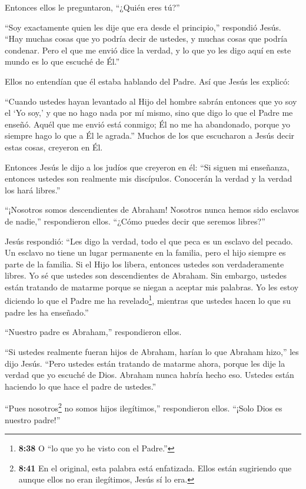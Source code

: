  Entonces ellos le preguntaron, ``¿Quién eres tú?''

``Soy exactamente quien les dije que era desde el principio,'' respondió
Jesús.  ``Hay muchas cosas que yo podría decir de ustedes,
y muchas cosas que podría condenar. Pero el que me envió dice la verdad,
y lo que yo les digo aquí en este mundo es lo que escuché de Él.''

 Ellos no entendían que él estaba hablando del Padre. Así
que Jesús les explicó:

 ``Cuando ustedes hayan levantado al Hijo del hombre sabrán
entonces que yo soy el `Yo soy,' y que no hago nada por mí mismo, sino
que digo lo que el Padre me enseñó.  Aquél que me envió
está conmigo; Él no me ha abandonado, porque yo siempre hago lo que a Él
le agrada.''  Muchos de los que escucharon a Jesús decir
estas cosas, creyeron en Él.

 Entonces Jesús le dijo a los judíos que creyeron en él:
``Si siguen mi enseñanza, entonces ustedes son realmente mis discípulos.
 Conocerán la verdad y la verdad los hará libres.''

 ``¡Nosotros somos descendientes de Abraham! Nosotros nunca
hemos sido esclavos de nadie,'' respondieron ellos. ``¿Cómo puedes decir
que seremos libres?''

 Jesús respondió: ``Les digo la verdad, todo el que peca es
un esclavo del pecado.  Un esclavo no tiene un lugar
permanente en la familia, pero el hijo siempre es parte de la familia.
 Si el Hijo los libera, entonces ustedes son verdaderamente
libres.  Yo sé que ustedes son descendientes de Abraham.
Sin embargo, ustedes están tratando de matarme porque se niegan a
aceptar mis palabras.  Yo les estoy diciendo lo que el
Padre me ha revelado\footnote{\textbf{8:38} O ``lo que yo he visto con
  el Padre.''}, mientras que ustedes hacen lo que su padre les ha
enseñado.''

 ``Nuestro padre es Abraham,'' respondieron ellos.

``Si ustedes realmente fueran hijos de Abraham, harían lo que Abraham
hizo,'' les dijo Jesús.  ``Pero ustedes están tratando de
matarme ahora, porque les dije la verdad que yo escuché de Dios. Abraham
nunca habría hecho eso.  Ustedes están haciendo lo que hace
el padre de ustedes.''

``Pues nosotros\footnote{\textbf{8:41} En el original, esta palabra está
  enfatizada. Ellos están sugiriendo que aunque ellos no eran
  ilegítimos, Jesús sí lo era.} no somos hijos ilegítimos,''
respondieron ellos. ``¡Solo Dios es nuestro padre!''

